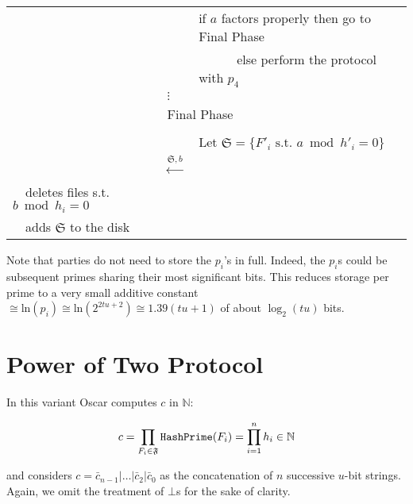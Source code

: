 \documentclass[11pt]{llncs}
\begin{document}
\begin{center}
\begin{tabular}{lcl}
                                   &                                                      &if $a$ factors properly then go to {\sf Final Phase}\\
                                   &                                                      &~~~~~~else perform the protocol with $p_4$ ~~\\
                                   &                  $\vdots$
& \\\midrule
\multicolumn{3}{c}{{\sf Final Phase~~}} \\\midrule
                                   &                                                      & \\
                                   &                                                      &Let $\mathfrak{S}=\{F'_i \mbox{~s.t.~} a \bmod h'_i =0\}$~~\\
                                   &~~{\LARGE $\stackrel{\mathfrak{S},b}{\longleftarrow}$}&\\
                                   ~~deletes files s.t. $b \bmod h_i =0$&                                                      &\\
                                   ~~adds $\mathfrak{S}$ to the disk
                                   &
                                   &\\\bottomrule
\end{tabular}
\end{center}

Note that parties do not need to store the $p_i$'s in full. Indeed, the $p_i$s could be subsequent primes sharing their most significant bits. This reduces storage per prime to a very small additive constant $ \cong \mbox{ln}(p_i) \cong \mbox{ln}(2^{2tu+2}) \cong 1.39(tu+1)$ of about $\log_2(tu)$ bits.

\section{Power of Two Protocol}
\label{powtwo}

In this variant Oscar computes $c$ in $\mathbb{N}$:

$$
c=\prod_{F_i\in \mathfrak{F}} \mbox{{\tt HashPrime}}(F_i) = \prod_{i=1}^n h_i \in \mathbb{N}
$$

and considers $c=\bar{c}_{n-1}|\ldots|\bar{c}_2|\bar{c}_0$ as the concatenation of $n$ successive $u$-bit strings. Again, we omit the treatment of $\bot$s for the sake of clarity.
\end{document}
